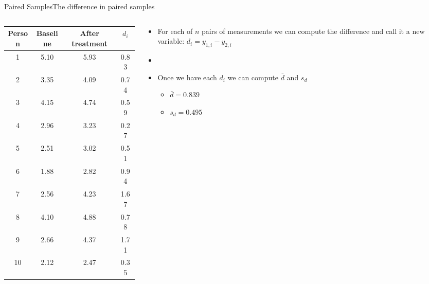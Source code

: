 \documentclass[xcolor=dvipsnames]{beamer}
\begin{document}
\begin{frame}{Paired Samples}{The difference in paired samples}
\begin{columns}
	\begin{column}{.5 \textwidth}
		{\scriptsize
			\begin{tabular}{|c|c|c|c|}
				\hline
				\textbf{Person} & \textbf{Baseline} &  \textbf{After treatment} & $d_i$ \\ \hline \hline
				1  &    5.10 &   5.93 &  0.83 \\ \hline 
				2  &    3.35 &   4.09 &  0.74 \\ \hline 
				3  &   4.15  &  4.74 &  0.59 \\ \hline 
				4  &   2.96  &  3.23 &  0.27 \\ \hline 
				5  &    2.51 &   3.02 &  0.51 \\ \hline 
				6  &   1.88  &  2.82 &  0.94 \\ \hline 
				7  &   2.56  &  4.23 &  1.67 \\ \hline 
				8  &    4.10 &   4.88 &  0.78 \\ \hline 
				9  &   2.66  &  4.37 &  1.71 \\ \hline 
				10  &    2.12  &  2.47 &  0.35 \\ \hline 
			\end{tabular}
		}
	\end{column}
	\begin{column}{.5 \textwidth}
			\begin{itemize}
			\item For each of $n$ pairs of measurements we can compute the difference and call it a new variable: $d_i = y_{1,i}-y_{2,i}$
			\item[]
			\item Once we have each $d_i$ we can compute $\bar{d}$ and $s_d$
			\begin{itemize}
				\item $\bar{d} = 0.839$
				\item $s_d = 0.495$
			\end{itemize}
		\end{itemize}
	\end{column}
\end{columns}
\end{frame}
\end{document}
